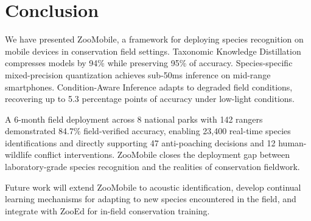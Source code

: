 \section{Conclusion}

\label{sec:conclusion}

We have presented ZooMobile, a framework for deploying species recognition on mobile devices in conservation field settings.
Taxonomic Knowledge Distillation compresses models by 94\% while preserving 95\% of accuracy.
Species-specific mixed-precision quantization achieves sub-50ms inference on mid-range smartphones.
Condition-Aware Inference adapts to degraded field conditions, recovering up to 5.3 percentage points of accuracy under low-light conditions.

A 6-month field deployment across 8 national parks with 142 rangers demonstrated 84.7\% field-verified accuracy, enabling 23,400 real-time species identifications and directly supporting 47 anti-poaching decisions and 12 human-wildlife conflict interventions.
ZooMobile closes the deployment gap between laboratory-grade species recognition and the realities of conservation fieldwork.

Future work will extend ZooMobile to acoustic identification, develop continual learning mechanisms for adapting to new species encountered in the field, and integrate with ZooEd for in-field conservation training.

